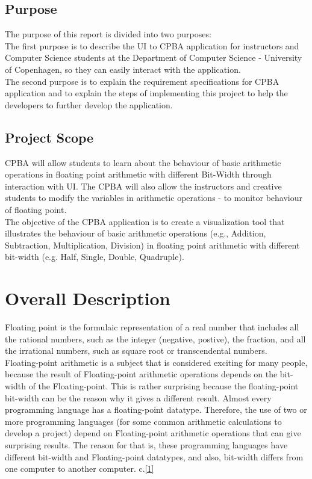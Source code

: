 \documentclass[11pt]{article}
\begin{document}
\subsection{Purpose}
The purpose of this report is divided into two purposes:\\

The first purpose is to describe the UI to CPBA application for instructors and Computer Science students at the Department of Computer Science - University of Copenhagen, so they can easily interact with the application.\\

The second purpose is to explain the requirement specifications for CPBA application and to explain the steps of implementing this project to help the developers to further develop the application.

\subsection{Project Scope}
CPBA will allow students to learn about the behaviour of basic arithmetic operations in floating point arithmetic with different Bit-Width through interaction with UI. The CPBA will also allow the instructors and creative students to modify the variables in arithmetic operations - to monitor behaviour of floating point.\\

The objective of the CPBA application is to create a visualization tool that illustrates the behaviour of basic arithmetic operations (e.g., Addition, Subtraction, Multiplication, Division) in floating point arithmetic with different bit-width (e.g. Half, Single, Double, Quadruple).\\

\section{Overall Description}
Floating point is the formulaic representation of a real number that includes all the rational numbers, such as the integer (negative, postive), the fraction, and all the irrational numbers, such as square root or  transcendental numbers.\\

Floating-point arithmetic is a subject that is considered exciting for many people, because the result of Floating-point arithmetic operations depends on the bit-width of the Floating-point. This is rather surprising because the floating-point bit-width can be the reason why it gives a different result. Almost every programming language has a floating-point datatype. Therefore, the use of two or more programming languages (for some common arithmetic calculations to develop a project) depend on Floating-point arithmetic operations that can give surprising results. The reason for that is, these programming languages have different bit-width and Floating-point datatypes, and also, bit-width differs from one computer to another computer. c.\ref{1}\\
\end{document}
